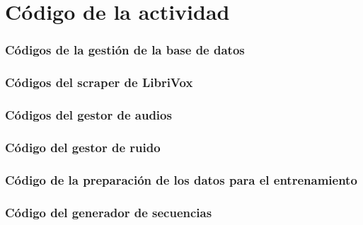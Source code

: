 \chapter{Código de la actividad}

\subsection{Códigos de la gestión de la base de datos}


\subsection{Códigos del scraper de LibriVox}


\subsection{Códigos del gestor de audios}


\subsection{Código del gestor de ruido}


\subsection{Código de la preparación de los datos para el entrenamiento}


\subsection{Código del generador de secuencias}

